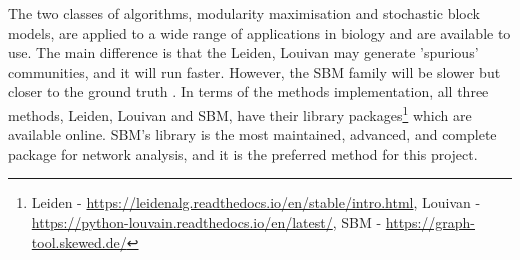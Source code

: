 The two classes of algorithms, modularity maximisation and stochastic block models, are applied to a wide range of applications in biology and are available to use. The main difference is that the Leiden, Louivan may generate 'spurious' communities, and it will run faster. However, the SBM family will be slower but closer to the ground truth \citep{Peixoto2023-mw}. In terms of the methods implementation, all three methods, Leiden, Louivan and SBM, have their library packages\footnote{Leiden - \url{https://leidenalg.readthedocs.io/en/stable/intro.html}, Louivan - \url{https://python-louvain.readthedocs.io/en/latest/}, SBM - \url{https://graph-tool.skewed.de/}} which are available online. SBM's library is the most maintained, advanced, and complete package for network analysis, and it is the preferred method for this project.






